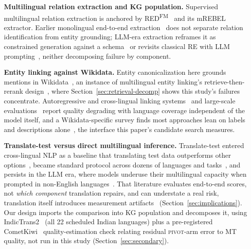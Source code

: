 \documentclass{llncs}
\begin{document}
\textbf{Multilingual relation extraction and KG population.}
Supervised multilingual relation extraction is anchored by
RED\textsuperscript{FM}~\cite{huguetcabot2023redfm} and its mREBEL
extractor. Earlier monolingual end-to-end
extraction~\cite{huguetcabot2021rebel} does not separate relation
identification from entity grounding; LLM-era extraction reframes it as
constrained generation against a
schema~\cite{josifoski2022genie} or revisits classical RE with LLM
prompting~\cite{wadhwa2023revisiting}, neither decomposing failure by
component.

\textbf{Entity linking against Wikidata.}
Entity canonicalization here grounds mentions in
Wikidata~\cite{vrandecic2014wikidata}, an instance of multilingual entity
linking's retrieve-then-rerank design~\cite{wu2020blink}, where
Section~\ref{sec:retrieval-decomp} shows this study's failures concentrate. Autoregressive and cross-lingual linking
systems~\cite{decao2022mgenre} and large-scale
evaluations~\cite{botha2020entitylinking100} report quality degrading with
language coverage independent of the model itself, and a Wikidata-specific
survey finds most approaches lean on labels and descriptions
alone~\cite{moller2022wikidatasurvey}, the interface this paper's
candidate search measures.

\textbf{Translate-test versus direct multilingual inference.}
Translate-test entered cross-lingual NLP as a baseline that translating test
data outperforms other options~\cite{conneau2018xnli}, became standard
protocol across dozens of languages and tasks~\cite{ahuja2023mega},
and persists in the LLM era, where models underuse their multilingual
capacity when prompted in non-English languages~\cite{etxaniz2024think}.
That literature evaluates end-to-end
scores, not \emph{which component} translation repairs, and can understate a
real risk, translation itself introduces measurement
artifacts~\cite{artetxe2020translationartifacts} (Section~\ref{sec:implications}).
Our design imports the comparison into KG population and decomposes it,
using IndicTrans2~\cite{gala2023indictrans2} (all 22 scheduled Indian
languages) plus a pre-registered CometKiwi~\cite{rei2022cometkiwi}
quality-estimation check relating residual \textsc{pivot}-arm error to MT
quality, not run in this study (Section~\ref{sec:secondary}).
\end{document}
